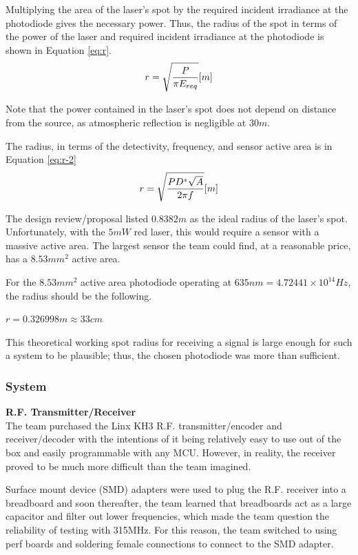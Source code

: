 \documentclass[letterpaper,10pt]{article}
\begin{document}
\begin{spacing}{1.15}
Multiplying the area of the laser's spot by the required incident irradiance at the photodiode gives the necessary power. Thus, the radius of the spot in terms of the power of the laser and required incident irradiance at the photodiode is shown in Equation \ref{eq:r}.
\begin{equation} \large \label{eq:r}
	r = \sqrt{\frac{P}{\pi E_{req}}} [m]
\end{equation}

Note that the power contained in the laser's spot does not depend on distance from the source, as atmospheric reflection is negligible at $30 m$.

The radius, in terms of the detectivity, frequency, and sensor active area is in Equation \ref{eq:r-2}
\begin{equation}\large \label{eq:r-2}
	r = \sqrt{\frac{PD^*\sqrt{A}}{2 \pi f}} [m]
\end{equation}

The design review/proposal listed $0.8382 m$ as the ideal radius of the laser's spot. Unfortunately, with the $5mW$ red laser, this would require a sensor with a massive active area. The largest sensor the team could find, at a reasonable price, has a $8.53 mm^2$ active area. 

For the $8.53 mm^2$ active area photodiode operating at $635 nm = 4.72441 × 10^{14} Hz$, the radius should be the following.
\begin{center}
	$r = 0.326998 m \approx 33 cm$
\end{center}

This theoretical working spot radius for receiving a signal is large enough for such a system to be plausible; thus, the chosen photodiode was more than sufficient. 

\subsubsection{System}

\hspace{5mm}\textbf{R.F. Transmitter/Receiver} \label{section:rf-transmitter-design-procedure} \\
The team purchased the Linx KH3 R.F. transmitter/encoder and receiver/decoder with the intentions of it being relatively easy to use out of the box and easily programmable with any MCU. However, in reality, the receiver proved to be much more difficult than the team imagined. 

Surface mount device (SMD) adapters were used to plug the R.F. receiver into a breadboard and soon thereafter, the team learned that breadboards act as a large capacitor and filter out lower frequencies, which made the team question the reliability of testing with 315MHz. For this reason, the team switched to using perf boards and soldering female connections to connect to the SMD adapter. 


\end{spacing}
\end{document}
